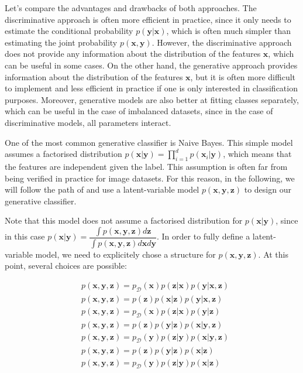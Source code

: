 \documentclass[10pt,twocolumn,letterpaper]{article}
\begin{document}
Let's compare the advantages and drawbacks of both approaches. The discriminative approach is often more efficient in practice, since it only needs to estimate the conditional probability $p(\bm{y}|\bm{x})$, which is often much simpler than estimating the joint probability $p(\bm{x}, \bm{y})$. However, the discriminative approach does not provide any information about the distribution of the features $\bm{x}$, which can be useful in some cases. On the other hand, the generative approach provides information about the distribution of the features $\bm{x}$, but it is often more difficult to implement and less efficient in practice if one is only interested in classification purposes. Moreover, generative models are also better at fitting classes separately, which can be useful in the case of imbalanced datasets, since in the case of discriminative models, all parameters interact. 

One of the most common generative classifier is Naive Bayes. This simple model assumes a factorised distribution $\displaystyle p(\bm{x}|\bm{y}) = \prod_{i=1}^d p(\bm{x}_i|\bm{y})$, which means that the features are independent given the label. This assumption is often far from being verified in practice for image datasets. For this reason, in the following, we will follow the path of \cite{main_paper} and use a latent-variable model $p(\bm{x}, \bm{y}, \bm{z})$ to design our generative classifier. 

Note that this model does not assume a factorised distribution for $p(\bm{x}|\bm{y})$, since in this case $p(\bm{x}|\bm{y}) = \displaystyle\dfrac{\int p(\bm{x}, \bm{y}, \bm{z}) d\bm{z}}{\int p(\bm{x}, \bm{y}, \bm{z}) d\bm{x} d\bm{y}}$. In order to fully define a latent-variable model, we need to explicitely chose a structure for $p(\bm{x}, \bm{y}, \bm{z})$. At this point, several choices are possible:

\begin{align*}
 & p(\bm{x}, \bm{y}, \bm{z}) = p_{\mathcal{D}}(\bm{x})p(\bm{z}|\bm{x})p(\bm{y}|\bm{x}, \bm{z}) \tag{DFX} \\
 & p(\bm{x}, \bm{y}, \bm{z}) = p(\bm{z})p(\bm{x}|\bm{z})p(\bm{y}|\bm{x}, \bm{z}) \tag{DFZ} \\
 & p(\bm{x}, \bm{y}, \bm{z}) = p_{\mathcal{D}}(\bm{x})p(\bm{z}|\bm{x})p(\bm{y}|\bm{z}) \tag{DBX} \\
 & p(\bm{x}, \bm{y}, \bm{z}) = p(\bm{z})p(\bm{y}|\bm{z})p(\bm{x}|\bm{y}, \bm{z}) \tag{GFZ} \\
 & p(\bm{x}, \bm{y}, \bm{z}) = p_{\mathcal{D}}(\bm{y})p(\bm{z}|\bm{y})p(\bm{x}|\bm{y}, \bm{z}) \tag{GFY} \\
 & p(\bm{x}, \bm{y}, \bm{z}) = p(\bm{z})p(\bm{y}|\bm{z})p(\bm{x}|\bm{z}) \tag{GBZ} \\
 & p(\bm{x}, \bm{y}, \bm{z}) = p_{\mathcal{D}}(\bm{y})p(\bm{z}|\bm{y})p(\bm{x}|\bm{z}) \tag{GBY} \\
\end{align*}
\end{document}
